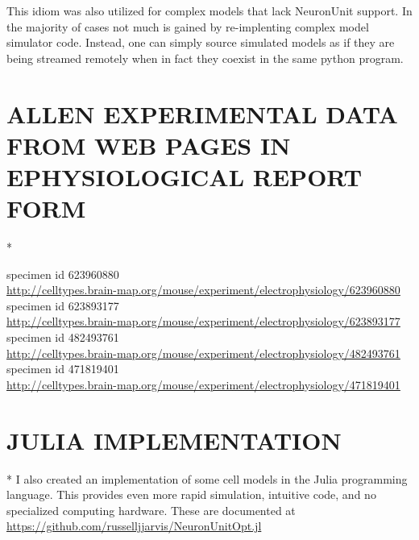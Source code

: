 This idiom was also utilized for complex models that lack NeuronUnit support.
In the majority of cases not much is gained by re-implenting complex model simulator code.
Instead, one can simply source simulated models as if they are being streamed remotely when in fact they coexist in the same python program.



\chapter{ALLEN EXPERIMENTAL DATA FROM WEB PAGES IN EPHYSIOLOGICAL REPORT FORM}*

\label{sec:allen_report_data}
specimen id 623960880 \\
{\small  
\url{http://celltypes.brain-map.org/mouse/experiment/electrophysiology/623960880}
specimen id 623893177 \\
\url{http://celltypes.brain-map.org/mouse/experiment/electrophysiology/623893177}
specimen id 482493761 \\
\url{http://celltypes.brain-map.org/mouse/experiment/electrophysiology/482493761}
specimen id 471819401 \\
\url{http://celltypes.brain-map.org/mouse/experiment/electrophysiology/471819401}
}

\chapter{JULIA IMPLEMENTATION}*
I also created an implementation of some cell models in the Julia programming language.
This provides even more rapid simulation, intuitive code, and no specialized computing hardware.
These are documented at
\url{https://github.com/russelljjarvis/NeuronUnitOpt.jl}


